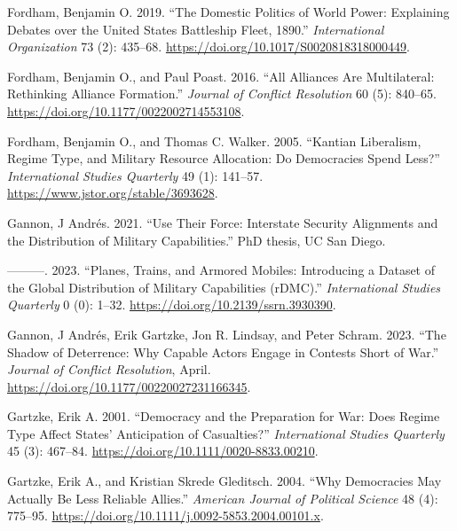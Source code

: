 \documentclass[
  12,
  letterpaper,
  DIV=11,
  numbers=noendperiod]{scrartcl}
\newlength{\cslhangindent}
\newlength{\cslentryspacingunit} %
\newenvironment{CSLReferences}[2] %
 {%
  \setlength{\parindent}{0pt}
  \ifodd #1
  \let\oldpar\par
  \def\par{\hangindent=\cslhangindent\oldpar}
  \fi
  \setlength{\parskip}{#2\cslentryspacingunit}
 }%
 {}
\begin{document}
\begin{CSLReferences}{1}{0}
\leavevmode{}%
Fordham, Benjamin O. 2019. {``The {Domestic Politics} of {World Power}:
{Explaining Debates} over the {United States Battleship Fleet},
1890.''} \emph{International Organization} 73 (2):
435--68. \url{https://doi.org/10.1017/S0020818318000449}.

\leavevmode{}%
Fordham, Benjamin O., and Paul Poast. 2016. {``All {Alliances Are
Multilateral}: {Rethinking Alliance Formation}.''} \emph{Journal of
Conflict Resolution} 60 (5): 840--65.
\url{https://doi.org/10.1177/0022002714553108}.

\leavevmode{}%
Fordham, Benjamin O., and Thomas C. Walker. 2005. {``Kantian
{Liberalism}, {Regime Type}, and {Military Resource Allocation}: {Do
Democracies Spend Less}?''} \emph{International Studies Quarterly} 49
(1): 141--57. \url{https://www.jstor.org/stable/3693628}.

\leavevmode{}%
Gannon, J Andrés. 2021. {``Use {Their Force}: {Interstate Security
Alignments} and the {Distribution} of {Military Capabilities}.''} PhD
thesis, UC San Diego.

\leavevmode{}%
---------. 2023. {``Planes, {Trains}, and {Armored Mobiles}:
{Introducing} a {Dataset} of the {Global Distribution} of {Military
Capabilities} ({rDMC}).''} \emph{International Studies Quarterly} 0 (0):
1--32. \url{https://doi.org/10.2139/ssrn.3930390}.

\leavevmode{}%
Gannon, J Andrés, Erik Gartzke, Jon R. Lindsay, and Peter Schram. 2023.
{``The {Shadow} of {Deterrence}: {Why Capable Actors Engage} in
{Contests Short} of {War}.''} \emph{Journal of Conflict Resolution},
April. \url{https://doi.org/10.1177/00220027231166345}.

\leavevmode{}%
Gartzke, Erik A. 2001. {``Democracy and the {Preparation} for {War}:
{Does Regime Type Affect States}' {Anticipation} of {Casualties}?''}
\emph{International Studies Quarterly} 45 (3): 467--84.
\url{https://doi.org/10.1111/0020-8833.00210}.

\leavevmode{}%
Gartzke, Erik A., and Kristian Skrede Gleditsch. 2004. {``Why
{Democracies May Actually Be Less Reliable Allies}.''} \emph{American
Journal of Political Science} 48 (4): 775--95.
\url{https://doi.org/10.1111/j.0092-5853.2004.00101.x}.


\end{CSLReferences}
\end{document}
